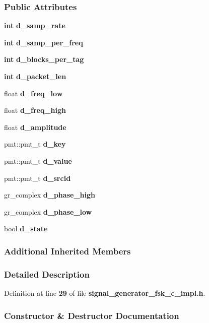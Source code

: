 \subsubsection*{Public Attributes}
\begin{DoxyCompactItemize}
\item 
{\bf int} {\bf d\+\_\+samp\+\_\+rate}
\item 
{\bf int} {\bf d\+\_\+samp\+\_\+per\+\_\+freq}
\item 
{\bf int} {\bf d\+\_\+blocks\+\_\+per\+\_\+tag}
\item 
{\bf int} {\bf d\+\_\+packet\+\_\+len}
\item 
float {\bf d\+\_\+freq\+\_\+low}
\item 
float {\bf d\+\_\+freq\+\_\+high}
\item 
float {\bf d\+\_\+amplitude}
\item 
pmt\+::pmt\+\_\+t {\bf d\+\_\+key}
\item 
pmt\+::pmt\+\_\+t {\bf d\+\_\+value}
\item 
pmt\+::pmt\+\_\+t {\bf d\+\_\+srcid}
\item 
gr\+\_\+complex {\bf d\+\_\+phase\+\_\+high}
\item 
gr\+\_\+complex {\bf d\+\_\+phase\+\_\+low}
\item 
bool {\bf d\+\_\+state}
\end{DoxyCompactItemize}
\subsubsection*{Additional Inherited Members}


\subsubsection{Detailed Description}


Definition at line {\bf 29} of file {\bf signal\+\_\+generator\+\_\+fsk\+\_\+c\+\_\+impl.\+h}.



\subsubsection{Constructor \& Destructor Documentation}
